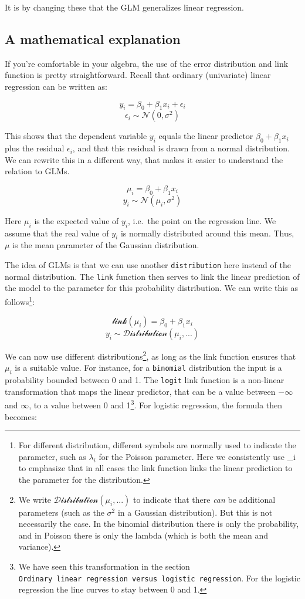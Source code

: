 \documentclass[
]{article}
\begin{document}
It is by changing these that the GLM generalizes linear regression.

\hypertarget{a-mathematical-explanation}{%
\subsection{A mathematical
explanation}\label{a-mathematical-explanation}}

If you're comfortable in your algebra, the use of the error distribution
and link function is pretty straightforward. Recall that ordinary
(univariate) linear regression can be written as:

\[ y_i = \beta_0 + \beta_1{x_i} + \epsilon_i \]
\[ \epsilon_i \sim \mathcal{N}(0, \sigma^2) \]

This shows that the dependent variable \(y_i\) equals the linear
predictor \(\beta_0 + \beta_1{x_i}\) plus the residual \(\epsilon_i\),
and that this residual is drawn from a normal distribution. We can
rewrite this in a different way, that makes it easier to understand the
relation to GLMs.

\[ \mu_i = \beta_0 + \beta_1{x_i} \]
\[ y_i \sim \mathcal{N}(\mu_i, \sigma^2) \]

Here \(\mu_i\) is the expected value of \(y_i\), i.e.~the point on the
regression line. We assume that the real value of \(y_i\) is normally
distributed around this mean. Thus, \(\mu\) is the mean parameter of the
Gaussian distribution.

The idea of GLMs is that we can use another \texttt{distribution} here
instead of the normal distribution. The \texttt{link} function then
serves to link the linear prediction of the model to the parameter for
this probability distribution. We can write this as follows\footnote{For
  different distribution, different symbols are normally used to
  indicate the parameter, such as \(\lambda_i\) for the Poisson
  parameter. Here we consistently use \mu\_i to emphasize that in all
  cases the link function links the linear prediction to the parameter
  for the distribution.}:

\[ \mathcal{link}(\mu_i) = \beta_0 + \beta_1{x_i} \]
\[ y_i \sim \mathcal{Distribution}(\mu_i, ...) \]

We can now use different distributions\footnote{We write
  \(\mathcal{Distribution}(\mu_i, ...)\) to indicate that there
  \emph{can} be additional parameters (such as the \(\sigma^2\) in a
  Gaussian distribution). But this is not necessarily the case. In the
  binomial distribution there is only the probability, and in Poisson
  there is only the lambda (which is both the mean and variance).}, as
long as the link function ensures that \(\mu_i\) is a suitable value.
For instance, for a \texttt{binomial} distribution the input is a
probability bounded between 0 and 1. The \texttt{logit} link function is
a non-linear transformation that maps the linear predictor, that can be
a value between \(-\infty\) and \(\infty\), to a value between 0 and
1\footnote{We have seen this transformation in the section
  \texttt{Ordinary\ linear\ regression\ versus\ logistic\ regression}.
  For the logistic regression the line curves to stay between 0 and 1.}.
For logistic regression, the formula then becomes:
\end{document}
